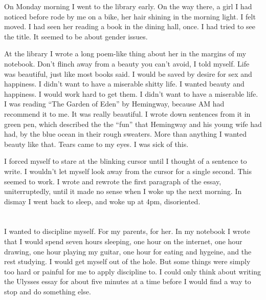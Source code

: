 On Monday morning I went to the library early.  On the way there, a girl I had
noticed before rode by me on a bike, her hair shining in the morning light.  I
felt moved.  I had seen her reading a book in the dining hall, once.  I had
tried to see the title.  It seemed to be about gender issues.

At the library I wrote a long poem-like thing about her in the margins of my
notebook.  Don't flinch away from a beauty you can't avoid, I told myself.  Life
was beautiful, just like most books said.  I would be saved by desire for sex and
happiness.  I didn't want to have a miserable shitty life.  I wanted beauty and
happiness.  I would work hard to get them.  I didn't want to have a miserable
life.  I was reading ``The Garden of Eden'' by Hemingway, because AM had recommend it to
me.  It was really beautiful.  I wrote down sentences from it in green pen,
which described the the ``fun'' that Hemingway and his young wife had had, by
the blue ocean in their rough sweaters.  More than anything I wanted beauty like
that.  Tears came to my eyes.  I was sick of this.

I forced myself to stare at the blinking cursor until I thought of a sentence to
write.  I wouldn't let myself look away from the cursor for a single second.
This seemed to work.  I wrote and rewrote the first paragraph of the essay,
uniterruptedly, until it made no sense when I woke up the next morning.  In
dismay I went back to sleep, and woke up at 4pm, disoriented.  

\section{}

I wanted to discipline myself.  For my parents, for her.  In my notebook I wrote
that I would spend seven hours sleeping, one hour on the internet, one hour
drawing, one hour playing my guitar, one hour for eating and hygeine, and the
rest studying.  I would get myself out of the hole.  But some things were simply
too hard or painful for me to apply discipline to.  I could only think about
writing the Ulysses essay for about five minutes at a time before I would find a
way to stop and do something else.

\section{}

